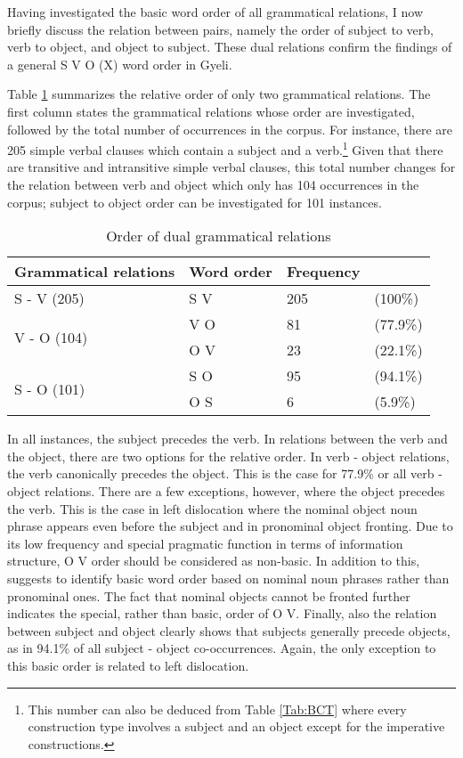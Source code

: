 Having investigated the basic word order of all grammatical relations, I now briefly discuss the relation between pairs, namely the order of subject to verb, verb to object, and object to subject. These dual relations confirm the findings of a general S V O (X) word order in Gyeli.

Table \ref{Tab:dualGram} summarizes the relative order of only two grammatical relations. The first column states the grammatical relations whose order are investigated, followed by the total number of occurrences in the corpus. For instance, there are 205 simple verbal clauses which contain a subject and a verb.\footnote{This number can also be deduced from Table \ref{Tab:BCT} where every construction type involves a subject and an object except for the imperative constructions.} Given that there are transitive and intransitive simple verbal clauses, this total number changes for the relation between verb and object which only has 104 occurrences in the corpus; subject to object order can be investigated for 101 instances.


\begin{table}[!h]
\centering
\begin{tabular}{l|lll}
 \midrule
Grammatical relations & Word order & Frequency &  \\ 
 \midrule
S - V        (205)                  &  S V & 205 & (100\%) \\  \midrule
\multirow{2}{*}{V - O (104)} &  V O & 81 & (77.9\%)  \\
                                  & O V & 23  & (22.1\%) \\  \midrule
\multirow{2}{*}{S - O (101)} &  S O &  95 & (94.1\%) \\
                                  & O S &  6     & (5.9\%) \\
 \midrule
\end{tabular}
\caption{Order of dual grammatical relations}
\label{Tab:dualGram}
\end{table}

In all instances, the subject precedes the verb. In relations between the verb and the object, there are two options for the relative order. In verb - object relations, the verb canonically precedes the object. This is the case for 77.9\% or all verb - object relations. There are a few exceptions, however, where the object precedes the verb. This is the case in left dislocation where the nominal object noun phrase appears even before the subject and in pronominal object fronting. Due to its low frequency and special pragmatic function in terms of information structure, O V order should be considered as non-basic. In addition to this, \citet[80]{dryer2007b} suggests to identify basic word order based on nominal noun phrases rather than pronominal ones. The fact that nominal objects cannot be fronted further indicates the special, rather than basic, order of O V.
Finally, also the relation between subject and object clearly shows that subjects generally precede objects, as in 94.1\% of all subject - object co-occurrences. Again, the only exception to this basic order is related to left dislocation.

